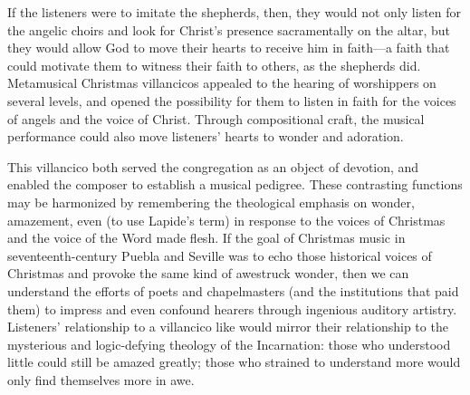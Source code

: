 If the listeners were to imitate the shepherds, then, they would not only
listen for the angelic choirs and look for Christ's presence sacramentally on
the altar, but they would allow God to move their hearts to receive him in
faith---a faith that could motivate them to witness their faith to others, as
the shepherds did.
Metamusical Christmas villancicos appealed to the hearing of worshippers on
several levels, and opened the possibility for them to listen in faith for the
voices of angels and the voice of Christ.
Through compositional craft, the musical performance could also move listeners'
hearts to wonder and adoration.

This villancico both served the congregation as an object of devotion, and
enabled the composer to establish a musical pedigree.
These contrasting functions may be harmonized by remembering the theological
emphasis on wonder, amazement, even  (to use Lapide's
term) in response to the voices of Christmas and the voice of the Word made
flesh.
If the goal of Christmas music in seventeenth-century Puebla and Seville was to
echo those historical voices of Christmas and provoke the same kind of awestruck
wonder, then we can understand the efforts of poets and chapelmasters (and the
institutions that paid them) to impress and even confound hearers through
ingenious auditory artistry.
Listeners' relationship to a villancico like 
would mirror their relationship to the mysterious and logic-defying theology of
the Incarnation: those who understood little could still be amazed greatly;
those who strained to understand more would only find themselves more in awe.

\endinput
